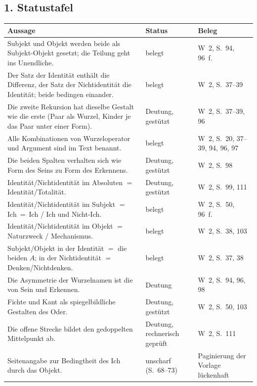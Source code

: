 \documentclass[11pt,a4paper]{article}
\newcommand{\SO}{Subjekt-Objekt}
\begin{document}
\subsection*{1. Statustafel}
\begin{center}
\renewcommand{\arraystretch}{1.3}
\begin{tabular}{@{}R{8.6cm}R{2.6cm}R{3.4cm}@{}}
\toprule
Aussage & Status & Beleg \\
\midrule
Subjekt und Objekt werden beide als \SO{} gesetzt; die Teilung geht ins Unendliche. & belegt & W~2, S.~94, 96~f. \\
Der Satz der Identität enthält die Differenz, der Satz der Nichtidentität die Identität; beide bedingen einander. & belegt & W~2, S.~37--39 \\
Die zweite Rekursion hat dieselbe Gestalt wie die erste (Paar als Wurzel, Kinder je das Paar unter einer Form). & Deutung, gestützt & W~2, S.~37--39, 96 \\
Alle Kombinationen von Wurzeloperator und Argument sind im Text benannt. & belegt & W~2, S.~20, 37--39, 94, 96, 97 \\
Die beiden Spalten verhalten sich wie Form des Seins zu Form des Erkennens. & Deutung, gestützt & W~2, S.~98 \\
Identität/Nichtidentität im Absoluten $=$ Identität/Totalität. & Deutung, gestützt & W~2, S.~99, 111 \\
Identität/Nichtidentität im Subjekt $=$ Ich~=~Ich / Ich und Nicht-Ich. & belegt & W~2, S.~50, 96~f. \\
Identität/Nichtidentität im Objekt $=$ Naturzweck / Mechanismus. & belegt & W~2, S.~38, 103 \\
Subjekt/Objekt in der Identität $=$ die beiden $A$; in der Nichtidentität $=$ Denken/Nichtdenken. & belegt & W~2, S.~37, 38 \\
Die Asymmetrie der Wurzelnamen ist die von Sein und Erkennen. & Deutung & W~2, S.~94, 96, 98 \\
Fichte und Kant als spiegelbildliche Gestalten des Oder. & Deutung, gestützt & W~2, S.~50, 103 \\
Die offene Strecke bildet den gedoppelten Mittelpunkt ab. & Deutung, rechnerisch geprüft & W~2, S.~111 \\
Seitenangabe zur Bedingtheit des Ich durch das Objekt. & unscharf (S.~68--73) & Paginierung der Vorlage lückenhaft \\
\bottomrule
\end{tabular}
\end{center}
\end{document}
